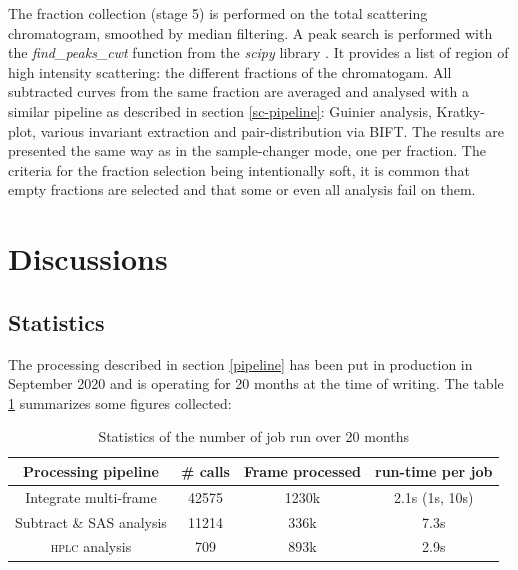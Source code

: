 \documentclass[preprint]{iucr}              %
\begin{document}
The fraction collection (stage 5) is performed on the total scattering chromatogram, smoothed by median filtering. 
A peak search is performed with the \textit{find\_peaks\_cwt} function from the \textit{scipy} library \cite{scipy}.
It provides a list of region of high intensity scattering: the different fractions of the chromatogam.
All subtracted curves from the same fraction are averaged and analysed with a similar pipeline as described in section \ref{sc-pipeline}: Guinier analysis, Kratky-plot, various invariant extraction and pair-distribution via BIFT.
The results are presented the same way as in the sample-changer mode, one per fraction.
The criteria for the fraction selection being intentionally soft, it is common that empty fractions are selected and that some or even all analysis fail on them. 

\section{Discussions}

\subsection{Statistics}
The processing described in section \ref{pipeline} has been put in production in September 2020 and is operating for 20 months at the time of writing.
The table \ref{stats} summarizes some figures collected:
\begin{table}
    \begin{tabular}{|c|c|c|c|}
        \hline
        Processing pipeline & # calls & Frame processed & run-time per job \\
        \hline
        Integrate multi-frame & 42575 & 1230k & 2.1s (1s, 10s) \\
        Subtract \& SAS analysis & 11214 & 336k & 7.3s \\
        \textsc{hplc} analysis & 709 & 893k & 2.9s \\
        \hline
    \end{tabular}
    \\
    \caption{Statistics of the number of job run over 20 months}
    \label{stats}
\end{table}
\end{document}
